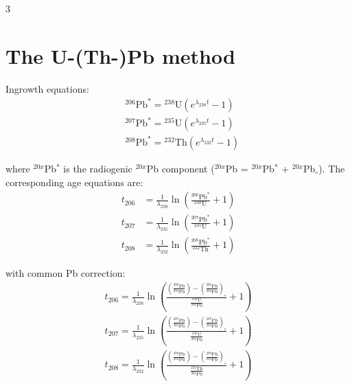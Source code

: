 \documentclass{article}
\begin{document}
\begin{multicols}{3}
\section{The U-(Th-)Pb method}
\label{sec:U-Th-Pb}

Ingrowth equations:
\begin{equation}
  \begin{array}{rl}
    &{}^{206}\mbox{Pb}^* = {}^{238}\mbox{U} \left(e^{\lambda_{238}t} - 1\right)\\ 
    &{}^{207}\mbox{Pb}^* = {}^{235}\mbox{U} \left(e^{\lambda_{235}t} - 1\right)\\ 
    &{}^{208}\mbox{Pb}^* = {}^{232}\mbox{Th} \left(e^{\lambda_{232}t} - 1\right)
  \end{array}
  \label{eq:Pb*}
\end{equation}

where ${}^{20x}$Pb$^*$ is the radiogenic ${}^{20x}$Pb component
(${}^{20x}$Pb = ${}^{20x}$Pb$^*$ + ${}^{20x}$Pb$_\circ$). The
corresponding age equations are:
\begin{equation}
  \begin{array}{rl}
    t_{206} & = \frac{1}{\lambda_{238}}
    \ln \left(\frac{{}^{206}\mbox{Pb}^*}{{}^{238}\mbox{U}}+1\right)\\
    t_{207} & = \frac{1}{\lambda_{235}}
    \ln \left(\frac{{}^{207}\mbox{Pb}^*}{{}^{235}\mbox{U}}+1\right)\\
    t_{208} & = \frac{1}{\lambda_{232}}
    \ln \left(\frac{{}^{208}\mbox{Pb}^*}{{}^{232}\mbox{Th}}+1\right)
  \end{array}
  \label{eq:tPb*}
\end{equation}

with common Pb correction:
\begin{equation}
\begin{array}{c}
  t_{206}=\frac{1}{\lambda_{238}}\ln\left(\frac{\left(\frac{{}^{206}\mbox{Pb}}{^{204}\mbox{Pb}}\right)-
    \left(\frac{^{206}\mbox{Pb}}{^{204}\mbox{Pb}}\right)_\circ}{\frac{^{238}\mbox{U}}{^{204}\mbox{Pb}}}+1\right)\\
  t_{207}=\frac{1}{\lambda_{235}}\ln\left(\frac{\left(\frac{^{207}\mbox{Pb}}{^{204}\mbox{Pb}}\right)-
    \left(\frac{^{207}\mbox{Pb}}{^{204}\mbox{Pb}}\right)_\circ}{\frac{^{235}\mbox{U}}{^{204}\mbox{Pb}}}+1\right)\\
  t_{208}=\frac{1}{\lambda_{232}}\ln\left(\frac{\left(\frac{^{208}\mbox{Pb}}{^{204}\mbox{Pb}}\right)-
    \left(\frac{^{208}\mbox{Pb}}{^{204}\mbox{Pb}}\right)_\circ}{\frac{^{232}\mbox{Th}}{^{204}\mbox{Pb}}}+1\right)
\end{array}
\label{eq:tPb}
\end{equation}


\end{multicols}
\end{document}
